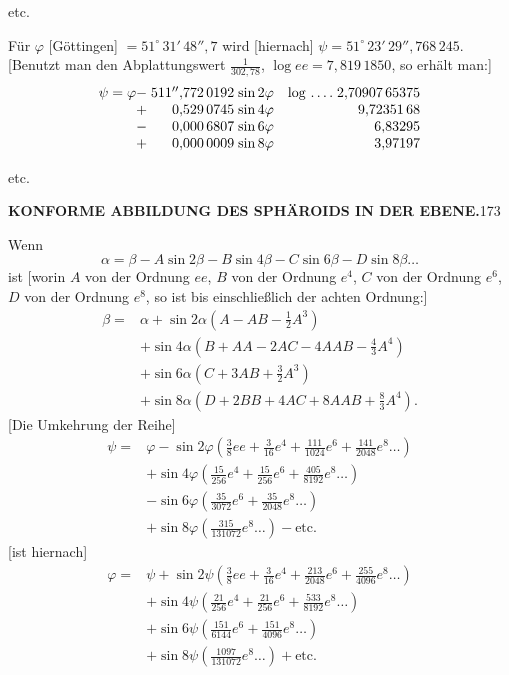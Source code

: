 {\centering etc.\par}
Für \(\varphi\) [Göttingen] \(=51^\circ\,31'\,48''{,}7\) wird [hiernach] \(\psi=51^\circ\,23'\,29''{,}768\,245\).
[Benutzt man den Abplattungswert \(\frac1{302{,}78}\), \(\log ee=7{,}819\,1850\), so erhält man:]
\[
\begin{array}{@{}r@{\;}r@{\;}l@{\quad}l@{\;}r@{}}
\psi=\varphi-&511''{,}772\,0192&\sin2\varphi&\log\,.\,.\,.\,.&2{,}70907\,65375\\
+&0{,}529\,0745&\sin4\varphi&&9{,}72351\,68\\
-&0{,}000\,6807&\sin6\varphi&&6{,}83295\\
+&0{,}000\,0009&\sin8\varphi&&3{,}97197
\end{array}
\]
{\centering etc.\par}

\par\clearpage
\noindent\null\hfill{\small\textbf{KONFORME ABBILDUNG DES SPHÄROIDS IN DER EBENE.}}\hfill173\par\medskip
{\centering [22.]\par}
Wenn
\[\alpha=\beta-A\sin2\beta-B\sin4\beta-C\sin6\beta-D\sin8\beta\ldots\]
\noindent ist [worin \(A\) von der Ordnung \(ee\), \(B\) von der Ordnung \(e^4\), \(C\) von der Ordnung \(e^6\), \(D\) von der Ordnung \(e^8\), so ist bis einschließlich der achten Ordnung:]
\[
\begin{aligned}
\beta={}&\alpha+\sin2\alpha(A-AB-\tfrac12A^3)\\
&+\sin4\alpha(B+AA-2AC-4AAB-\tfrac43A^4)\\
&+\sin6\alpha(C+3AB+\tfrac32A^3)\\
&+\sin8\alpha(D+2BB+4AC+8AAB+\tfrac83A^4).
\end{aligned}
\]
[Die Umkehrung der Reihe]
\[
\begin{aligned}
\psi={}&\varphi-\sin2\varphi(\tfrac38ee+\tfrac3{16}e^4+\tfrac{111}{1024}e^6+\tfrac{141}{2048}e^8\ldots)\\
&+\sin4\varphi(\tfrac{15}{256}e^4+\tfrac{15}{256}e^6+\tfrac{405}{8192}e^8\ldots)\\
&-\sin6\varphi(\tfrac{35}{3072}e^6+\tfrac{35}{2048}e^8\ldots)\\
&+\sin8\varphi(\tfrac{315}{131072}e^8\ldots)-\text{etc.}
\end{aligned}
\]
[ist hiernach]
\[
\begin{aligned}
\varphi={}&\psi+\sin2\psi(\tfrac38ee+\tfrac3{16}e^4+\tfrac{213}{2048}e^6+\tfrac{255}{4096}e^8\ldots)\\
&+\sin4\psi(\tfrac{21}{256}e^4+\tfrac{21}{256}e^6+\tfrac{533}{8192}e^8\ldots)\\
&+\sin6\psi(\tfrac{151}{6144}e^6+\tfrac{151}{4096}e^8\ldots)\\
&+\sin8\psi(\tfrac{1097}{131072}e^8\ldots)+\text{etc.}
\end{aligned}
\]
